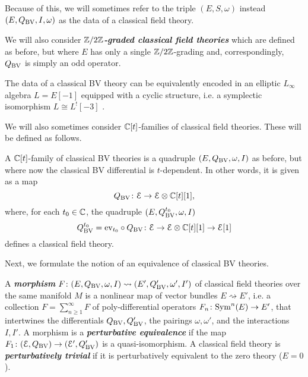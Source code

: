 \documentclass[10pt, oneside]{article}
\newcommand{\defterm}[1]{\textbf{\emph{#1}}}
\begin{document}
Because of this, we will sometimes refer to the triple $(E, S, \omega)$ instead $(E, Q_{\mathrm{BV}}, I, \omega)$ as the data of a classical field theory.

\begin{remark}
We will also consider \defterm{$\mathbb Z/2\mathbb Z$-graded classical field theories} which are defined as before, but where $E$ has only a single $\mathbb Z/2\mathbb Z$-grading and, correspondingly, $Q_{\mathrm{BV}}$ is simply an odd operator.
\end{remark}

\begin{remark}
The data of a classical BV theory can be equivalently encoded in an elliptic $L_\infty$ algebra $L=E[-1]$ equipped with a cyclic structure, i.e. a symplectic isomorphism $L\cong L^![-3]$ \cite[Chapter 5.4]{Book2}. 
\end{remark}

We will also sometimes consider $\mathbb C[t]$-families of classical field theories.  These will be defined as follows.
\begin{definition} \label{family_of_BV_theories_def}
A $\mathbb C[t]$-family of classical BV theories is a quadruple $(E,Q_{\mathrm{BV}}, \omega, I)$ as before, but where now the classical BV differential is $t$-dependent.  In other words, it is given as a map
\[Q_{\mathrm{BV}} \colon \mathcal E \to \mathcal E  \otimes \mathbb C[t] [1],\]
where, for each $t_0 \in \mathbb C$, the quadruple $(E,Q^{t_0}_{\mathrm{BV}}, \omega, I)$
\[Q^{t_0}_{\mathrm{BV}} = \mathrm{ev}_{t_0} \circ Q_{\mathrm{BV}} \colon \mathcal E \to \mathcal E  \otimes \mathbb C[t] [1] \to \mathcal E[1]\]
defines a classical field theory.
\end{definition}

Next, we formulate the notion of an equivalence of classical BV theories. 

\begin{definition}
A \defterm{morphism} $F\colon (E, Q_{\mathrm{BV}}, \omega, I) \rightsquigarrow (E', Q_{\mathrm{BV}}', \omega', I')$ of classical field theories over the same manifold $M$ is a nonlinear map of vector bundles $E\rightsquigarrow E'$, i.e. a collection $F=\sum_{n\geq 1}^\infty F$ of poly-differential operators $F_n\colon {\rm Sym}^n(E)\rightarrow E'$, that intertwines the differentials $Q_{\mathrm{BV}}, Q_{\mathrm{BV}}'$, the pairings $\omega, \omega'$, and the interactions $I,I'$. A morphism is a \defterm{perturbative equivalence} if the map $F_1\colon (\mathcal E, Q_{\mathrm{BV}})\rightarrow (\mathcal E', Q_{\mathrm{BV}}')$ is a quasi-isomorphism. A classical field theory is \defterm{perturbatively trivial} if it is perturbatively equivalent to the zero theory ($E = 0$).
\end{definition}
\end{document}
